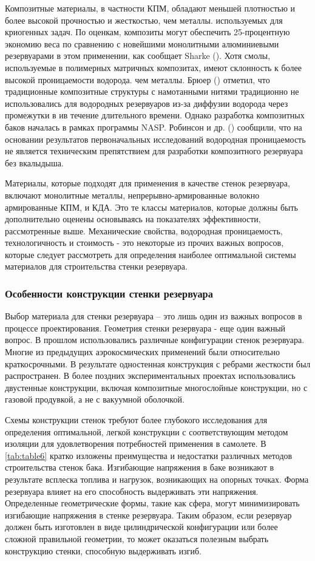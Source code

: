 Композитные материалы, в частности КПМ, обладают меньшей плотностью и более высокой прочностью и жесткостью, чем металлы. используемых для криогенных задач. По оценкам, композиты могут обеспечить 25-процентную экономию веса по сравнению с новейшими монолитными алюминиевыми резервуарами в этом применении, как сообщает Sharke (\cite{sharke2004}).
Хотя смолы, используемые в полимерных матричных композитах, имеют склонность к более высокой проницаемости водорода. чем металлы. Брюер (\cite{brewer1991}) отметил, что традиционные композитные структуры с намотанными нитями традиционно не использовались для водородных резервуаров из-за диффузии водорода через промежутки в ив течение длительного времени. Однако разработка композитных баков началась в рамках программы NASP.  Робинсон и др. (\cite{robinson2002}) сообщили, что на основании результатов первоначальных исследований водородная проницаемость не является техническим препятствием для разработки композитного резервуара без вкалыдыша.

Материалы, которые подходят для применения в качестве стенок резервуара, включают монолитные металлы, непрерывно-армированные волокно армированные КПМ, и КДА. Это те классы материалов, которые должны быть дополнительно оценены основываясь на показателях эффективности, рассмотренные выше. Механические свойства, водородная проницаемость, технологичность и стоимость - это некоторые из прочих важных вопросов, которые следует рассмотреть для определения наиболее оптимальной системы материалов для строительства стенки резервуара.

\subsubsection{Особенности конструкции стенки резервуара}\label{ch:overview:1:sec4:sub2:subsub2}

Выбор материала для стенки резервуара -- это лишь один из важных вопросов в процессе проектирования. Геометрия стенки резервуара - еще один важный вопрос. В прошлом использовались различные конфигурации стенок резервуара.  Многие из предыдущих аэрокосмических применений были относительно краткосрочными. В результате одностенная конструкция с ребрами жесткости был распространен. В более поздних экспериментальных проектах использовались двустенные конструкции, включая композитные многослойные конструкции, но с газовой продувкой, а не с вакуумной оболочкой.

Схемы конструкции стенок требуют более глубокого исследования для определения оптимальной, легкой конструкции с соответствующим методом изоляции для удовлетворения потребностей применения в самолете. В \cref{tab:table6} кратко изложены преимущества и недостатки различных методов строительства стенок бака. Изгибающие напряжения в баке возникают в результате всплеска топлива и нагрузок, возникающих на опорных точках. Форма резервуара влияет на его способность выдерживать эти напряжения. Определенные геометрические формы, такие как сфера, могут минимизировать изгибающие напряжения в стенке резервуара. Таким образом, если резервуар должен быть изготовлен в виде цилиндрической конфигурации или более сложной правильной геометрии, то может оказаться полезным выбрать конструкцию стенки, способную выдерживать изгиб.

